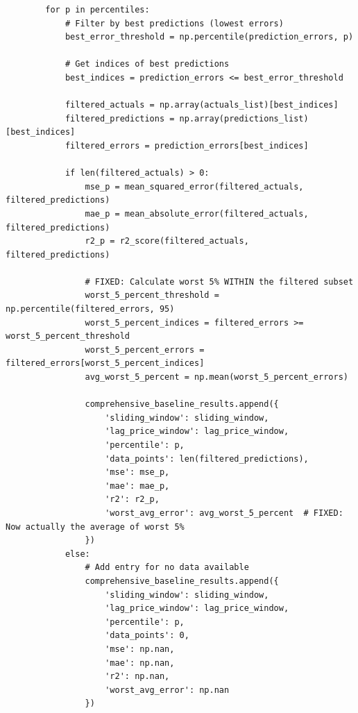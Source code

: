 \documentclass[12pt]{report} %
\begin{document}
\begin{lstlisting}
        for p in percentiles:
            # Filter by best predictions (lowest errors)
            best_error_threshold = np.percentile(prediction_errors, p)
            
            # Get indices of best predictions 
            best_indices = prediction_errors <= best_error_threshold

            filtered_actuals = np.array(actuals_list)[best_indices]
            filtered_predictions = np.array(predictions_list)[best_indices]
            filtered_errors = prediction_errors[best_indices]

            if len(filtered_actuals) > 0:
                mse_p = mean_squared_error(filtered_actuals, filtered_predictions)
                mae_p = mean_absolute_error(filtered_actuals, filtered_predictions)
                r2_p = r2_score(filtered_actuals, filtered_predictions)
                
                # FIXED: Calculate worst 5% WITHIN the filtered subset
                worst_5_percent_threshold = np.percentile(filtered_errors, 95)
                worst_5_percent_indices = filtered_errors >= worst_5_percent_threshold
                worst_5_percent_errors = filtered_errors[worst_5_percent_indices]
                avg_worst_5_percent = np.mean(worst_5_percent_errors)

                comprehensive_baseline_results.append({
                    'sliding_window': sliding_window,
                    'lag_price_window': lag_price_window,
                    'percentile': p,
                    'data_points': len(filtered_predictions),
                    'mse': mse_p,
                    'mae': mae_p,
                    'r2': r2_p,
                    'worst_avg_error': avg_worst_5_percent  # FIXED: Now actually the average of worst 5%
                })
            else:
                # Add entry for no data available
                comprehensive_baseline_results.append({
                    'sliding_window': sliding_window,
                    'lag_price_window': lag_price_window,
                    'percentile': p,
                    'data_points': 0,
                    'mse': np.nan,
                    'mae': np.nan,
                    'r2': np.nan,
                    'worst_avg_error': np.nan
                })
\end{lstlisting}
\end{document}
